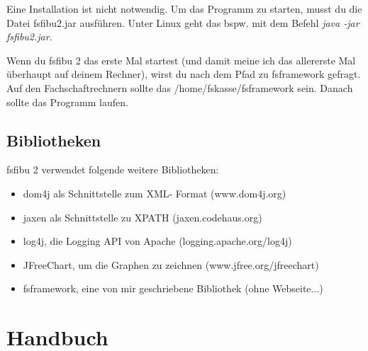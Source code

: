 \documentclass[a4paper,10pt,halfparskip,oneside,smallheadings]{scrbook}
\begin{document}
Eine Installation ist nicht notwendig. Um das Programm zu starten, musst du die Datei fsfibu2.jar ausführen. Unter Linux geht das bspw. mit dem Befehl \textit{java -jar fsfibu2.jar}.

Wenn du fsfibu 2 das erste Mal startest (und damit meine ich das allererste Mal überhaupt auf deinem Rechner), wirst 
du nach dem Pfad zu fsframework gefragt. Auf den Fachschaftrechnern sollte das /home/fskasse/fsframework sein. Danach sollte das Programm laufen.

\section{Bibliotheken}
fsfibu 2 verwendet folgende weitere Bibliotheken:
\begin{itemize}
 \item dom4j als Schnittstelle zum XML- Format (www.dom4j.org)
 \item jaxen als Schnittstelle zu XPATH (jaxen.codehaus.org)
 \item log4j, die Logging API von Apache (logging.apache.org/log4j)
 \item JFreeChart, um die Graphen zu zeichnen (www.jfree.org/jfreechart)
 \item fsframework, eine von mir geschriebene Bibliothek (ohne Webseite...)
\end{itemize}


\chapter{Handbuch}
\end{document}
